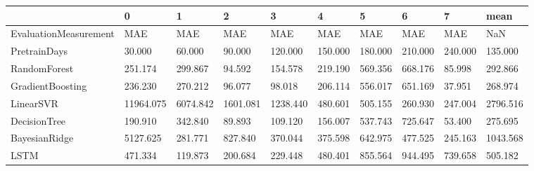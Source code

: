 \begin{tabular}{llllllllll}
\toprule
{} &         0 &        1 &        2 &        3 &       4 &       5 &       6 &       7 &     mean \\
\midrule
EvaluationMeasurement &       MAE &      MAE &      MAE &      MAE &     MAE &     MAE &     MAE &     MAE &      NaN \\
PretrainDays          &    30.000 &   60.000 &   90.000 &  120.000 & 150.000 & 180.000 & 210.000 & 240.000 &  135.000 \\
RandomForest          &   251.174 &  299.867 &   94.592 &  154.578 & 219.190 & 569.356 & 668.176 &  85.998 &  292.866 \\
GradientBoosting      &   236.230 &  270.212 &   96.077 &   98.018 & 206.114 & 556.017 & 651.169 &  37.951 &  268.974 \\
LinearSVR             & 11964.075 & 6074.842 & 1601.081 & 1238.440 & 480.601 & 505.155 & 260.930 & 247.004 & 2796.516 \\
DecisionTree          &   190.910 &  342.840 &   89.893 &  109.120 & 156.007 & 537.743 & 725.647 &  53.400 &  275.695 \\
BayesianRidge         &  5127.625 &  281.771 &  827.840 &  370.044 & 375.598 & 642.975 & 477.525 & 245.163 & 1043.568 \\
LSTM                  &   471.334 &  119.873 &  200.684 &  229.448 & 480.401 & 855.564 & 944.495 & 739.658 &  505.182 \\
\bottomrule
\end{tabular}
